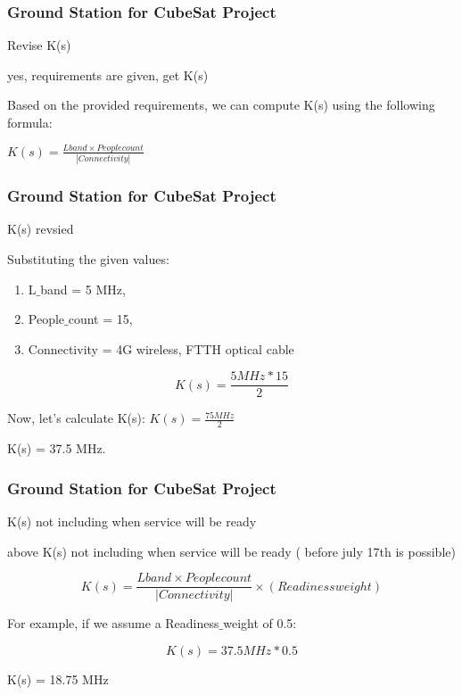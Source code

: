 \newpage
\begin{frame}
\frametitle{Ground Station for CubeSat Project }
\begin{block}{Revise K(s)}

yes, requirements are given,  get K(s)

Based on the provided requirements, we can compute K(s) using the following formula:

$ K(s) = \frac{Lband  \times Peoplecount}{|Connectivity|}   $


\end{block}
\end{frame}



\newpage
\begin{frame}
\frametitle{Ground Station for CubeSat Project }
\begin{block}{ K(s) revsied }

Substituting the given values: 

\begin{enumerate}
    \item  L$\_$band = 5 MHz,
        \item  People$\_$count = 15,
        \item  Connectivity = {4G wireless, FTTH optical cable}
\end{enumerate}





\[ K(s) = \frac{5 MHz * 15}{2} \]

Now, let's calculate K(s):  $K(s) = \frac{75 MHz}{2}$ 

K(s) =  37.5 MHz.



\end{block}
\end{frame}




\newpage
\begin{frame}
\frametitle{Ground Station for CubeSat Project }
\begin{block}{K(s) not including when service will be ready}

above K(s) not including when service will be ready ( before july 17th is possible)

\[  K(s) = \frac{Lband \times Peoplecount}{|Connectivity|} \times (Readinessweight)   \]

For example, if we assume a Readiness$\_$weight of 0.5:

\[
K(s) = 37.5 MHz * 0.5 
\]

K(s) = 18.75 MHz


\end{block}
\end{frame}


